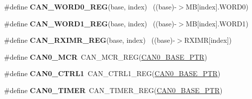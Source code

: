 \begin{DoxyCompactItemize}
\item 
\hypertarget{group___c_a_n___register___accessor___macros_gab486ab7c313c1c3ab3ea1d146a4e4597}{}\#define {\bfseries C\+A\+N\+\_\+\+W\+O\+R\+D0\+\_\+\+R\+E\+G}(base,  index)                            ~((base)-\/$>$M\+B\mbox{[}index\mbox{]}.W\+O\+R\+D0)\label{group___c_a_n___register___accessor___macros_gab486ab7c313c1c3ab3ea1d146a4e4597}

\item 
\hypertarget{group___c_a_n___register___accessor___macros_gabea0fd7f957d3c4e7770f1670aff54dc}{}\#define {\bfseries C\+A\+N\+\_\+\+W\+O\+R\+D1\+\_\+\+R\+E\+G}(base,  index)                            ~((base)-\/$>$M\+B\mbox{[}index\mbox{]}.W\+O\+R\+D1)\label{group___c_a_n___register___accessor___macros_gabea0fd7f957d3c4e7770f1670aff54dc}

\item 
\hypertarget{group___c_a_n___register___accessor___macros_gabcdb674583aff011e9cae0837f6abd5a}{}\#define {\bfseries C\+A\+N\+\_\+\+R\+X\+I\+M\+R\+\_\+\+R\+E\+G}(base,  index)                            ~((base)-\/$>$R\+X\+I\+M\+R\mbox{[}index\mbox{]})\label{group___c_a_n___register___accessor___macros_gabcdb674583aff011e9cae0837f6abd5a}

\item 
\hypertarget{group___c_a_n___register___accessor___macros_ga300565478bb512e7ca03af0ecf31137a}{}\#define {\bfseries C\+A\+N0\+\_\+\+M\+C\+R}~C\+A\+N\+\_\+\+M\+C\+R\+\_\+\+R\+E\+G(\hyperlink{group___c_a_n___peripheral_ga1ee8f499e10af9b8e3132e0168e519b9}{C\+A\+N0\+\_\+\+B\+A\+S\+E\+\_\+\+P\+T\+R})\label{group___c_a_n___register___accessor___macros_ga300565478bb512e7ca03af0ecf31137a}

\item 
\hypertarget{group___c_a_n___register___accessor___macros_gacd647d438a70b740aca411d35aee6de2}{}\#define {\bfseries C\+A\+N0\+\_\+\+C\+T\+R\+L1}~C\+A\+N\+\_\+\+C\+T\+R\+L1\+\_\+\+R\+E\+G(\hyperlink{group___c_a_n___peripheral_ga1ee8f499e10af9b8e3132e0168e519b9}{C\+A\+N0\+\_\+\+B\+A\+S\+E\+\_\+\+P\+T\+R})\label{group___c_a_n___register___accessor___macros_gacd647d438a70b740aca411d35aee6de2}

\item 
\hypertarget{group___c_a_n___register___accessor___macros_ga962b913ec16b41232cddb038bdbbf47b}{}\#define {\bfseries C\+A\+N0\+\_\+\+T\+I\+M\+E\+R}~C\+A\+N\+\_\+\+T\+I\+M\+E\+R\+\_\+\+R\+E\+G(\hyperlink{group___c_a_n___peripheral_ga1ee8f499e10af9b8e3132e0168e519b9}{C\+A\+N0\+\_\+\+B\+A\+S\+E\+\_\+\+P\+T\+R})\label{group___c_a_n___register___accessor___macros_ga962b913ec16b41232cddb038bdbbf47b}


\end{DoxyCompactItemize}
